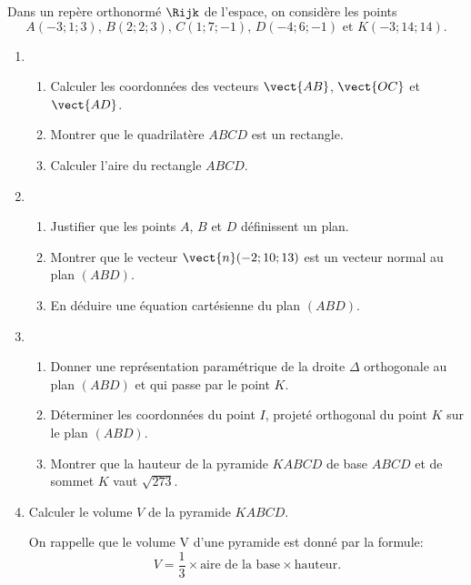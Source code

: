 Dans un repère orthonormé $\Rijk$ de l'espace, on considère les points \[A(-3;1;3)\text{, } B(2;2;3)\text{, } C(1;7;-1)\text{, } D(-4;6;-1) \text{ et } K(-3;14;14).\]
%
\begin{enumerate}
	\item 
	\begin{enumerate}
		\item Calculer les coordonnées des vecteurs $\vect{AB}$, $\vect{OC}$ et $\vect{AD}$.
		\item Montrer que le quadrilatère $ABCD$ est un rectangle.
		\item Calculer l'aire du rectangle $ABCD$.
	\end{enumerate}
	\item 
	\begin{enumerate}
		\item Justifier que les points $A$, $B$ et $D$ définissent un plan.
		\item Montrer que le vecteur $\vect{n}(-2;10;13)$ est un vecteur normal au plan $(ABD)$.
		\item  En déduire une équation cartésienne du plan $(ABD)$.
	\end{enumerate}
	\item
	\begin{enumerate}
		\item Donner une représentation paramétrique de la droite $\Delta$ orthogonale au plan $(ABD)$ et qui passe par le point $K$.
		\item Déterminer les coordonnées du point $I$, projeté orthogonal du point $K$ sur le plan $(ABD)$.
		\item Montrer que la hauteur de la pyramide $KABCD$ de base $ABCD$ et de sommet $K$ vaut $\sqrt{273}$.
	\end{enumerate}
	\item Calculer le volume $V$ de la pyramide $KABCD$.
	
	On rappelle que le volume V d'une pyramide est donné par la formule: \[V= \dfrac13 \times \text{aire de la base} \times \text{hauteur}.\]
\end{enumerate}

